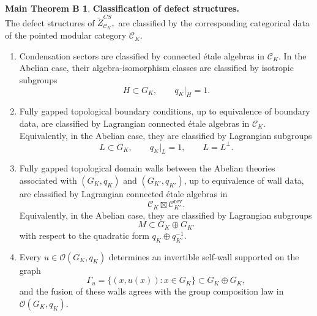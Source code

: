 \documentclass[12pt]{amsart}
\numberwithin{equation}{section}
\theoremstyle{definition}
\newtheorem*{theoremB}{Main Theorem B}
\begin{document}
\begin{theoremB}\textbf{Classification of defect structures.}
\leavevmode\\

The defect structures of $\widetilde Z^{CS}_{\mathcal C_K},$ are classified by the corresponding categorical data of the pointed modular category $\mathcal C_K$.

\begin{enumerate}

\item Condensation sectors are classified by connected étale algebras in
$\mathcal C_K$. In the Abelian case, their algebra-isomorphism
classes are classified by isotropic subgroups
$$
H\subset G_K,
\qquad
q_K|_H=1 .
$$

\item Fully gapped topological boundary conditions, up to equivalence of
boundary data, are classified by Lagrangian connected étale algebras in
$\mathcal C_K$. Equivalently, in the Abelian case, they are classified
by Lagrangian subgroups
$$
L\subset G_K,
\qquad
q_K|_L=1,
\qquad
L=L^\perp .
$$

\item Fully gapped topological domain walls between the Abelian theories
associated with $(G_K,q_K)$ and $(G_{K'},q_{K'})$, up to equivalence of wall
data, are classified by Lagrangian connected étale algebras in
$$
\mathcal C_K\boxtimes\mathcal C_{K'}^{\mathrm{rev}} .
$$
Equivalently, in the Abelian case, they are classified by Lagrangian
subgroups
$$
M\subset G_K\oplus G_{K'}
$$
with respect to the quadratic form
$
q_K\oplus q_{K'}^{-1}.
$

\item Every
$
u\in \mathcal O(G_K,q_K)  
$ determines an invertible self-wall supported on the graph
$$
\Gamma_u
=
\{(x,u(x)):x\in G_K\}
\subset
G_K\oplus G_K ,
$$
and the fusion of these walls agrees with the group composition law in
$\mathcal O(G_K,q_K)  $.

\end{enumerate}
\end{theoremB}
\end{document}
